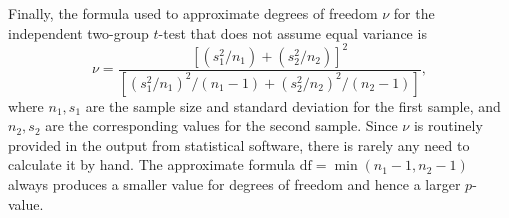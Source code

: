
Finally, the formula used to approximate degrees of freedom $\nu$ for the independent two-group $t$-test that does not assume equal variance is 
\[\nu = \dfrac{\left[(s_1^2/n_1) + (s_2^2/n_2)\right]^2}{\left[(s_1^2/n_1)^2/(n_1 - 1) + (s_2^2/n_2)^2/(n_2 - 1)\right]}, \]
where $n_1, s_1$ are the sample size and standard deviation for the first sample, and $n_2, s_2$ are the corresponding values for the second sample.
Since $\nu$ is routinely provided in the output from statistical software, there is rarely any need to calculate it by hand.  The approximate formula $\text{df} = \min(n_1 - 1, n_2 - 1)$ always produces a smaller value for degrees of freedom and hence a larger $p$-value.



